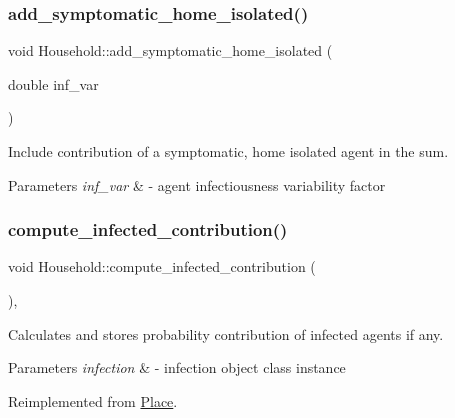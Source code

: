 \subsubsection{\texorpdfstring{add\+\_\+symptomatic\+\_\+home\+\_\+isolated()}{add\_symptomatic\_home\_isolated()}}
{\footnotesize\ttfamily void Household\+::add\+\_\+symptomatic\+\_\+home\+\_\+isolated (\begin{DoxyParamCaption}\item[{double}]{inf\+\_\+var }\end{DoxyParamCaption})\hspace{0.3cm}{\ttfamily [inline]}}



Include contribution of a symptomatic, home isolated agent in the sum. 


\begin{DoxyParams}{Parameters}
{\em inf\+\_\+var} & -\/ agent infectiousness variability factor \\
\hline
\end{DoxyParams}
\mbox{\label{classHousehold_ae063737d06a7a50aa9b780d7066c1c88}} 
\subsubsection{\texorpdfstring{compute\+\_\+infected\+\_\+contribution()}{compute\_infected\_contribution()}}
{\footnotesize\ttfamily void Household\+::compute\+\_\+infected\+\_\+contribution (\begin{DoxyParamCaption}{ }\end{DoxyParamCaption})\hspace{0.3cm}{\ttfamily [override]}, {\ttfamily [virtual]}}



Calculates and stores probability contribution of infected agents if any. 


\begin{DoxyParams}{Parameters}
{\em infection} & -\/ infection object class instance \\
\hline
\end{DoxyParams}


Reimplemented from \hyperlink{classPlace_aeb4c561e8bc4e1ae7186baed6ef1aa47}{Place}.

